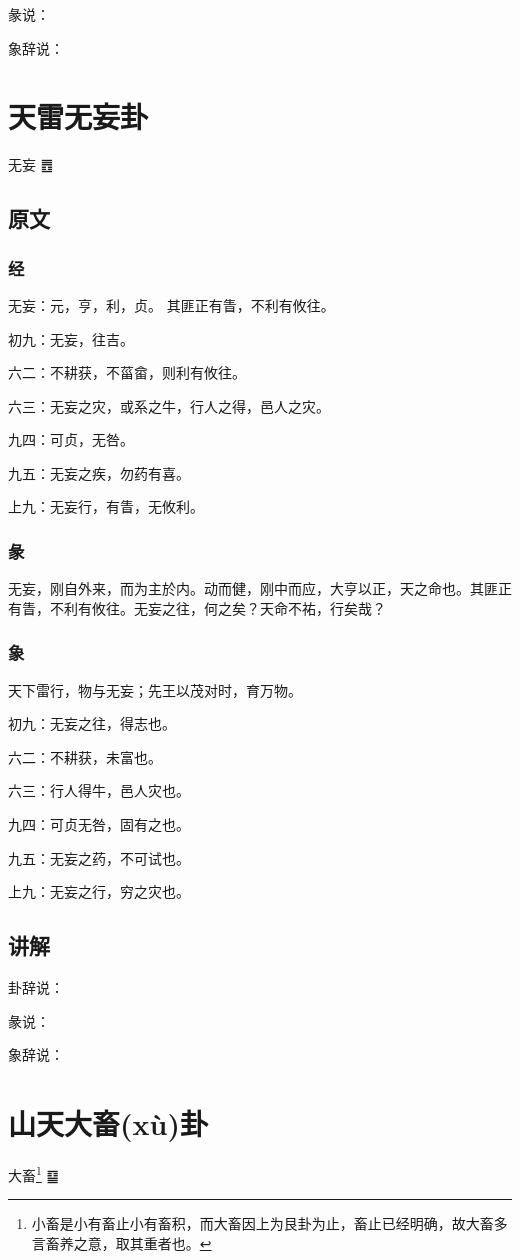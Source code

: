 \documentclass[12pt,oneside]{book}
\begin{document}
彖说：

象辞说：

\chapter{天雷无妄卦}
无妄 {\Large ䷘}

\section{原文}
\subsection{经}
无妄：元，亨，利，贞。 其匪正有眚，不利有攸往。

初九：无妄，往吉。

六二：不耕获，不菑畲，则利有攸往。

六三：无妄之灾，或系之牛，行人之得，邑人之灾。

九四：可贞，无咎。

九五：无妄之疾，勿药有喜。

上九：无妄行，有眚，无攸利。

\subsection{彖}
无妄，刚自外来，而为主於内。动而健，刚中而应，大亨以正，天之命也。其匪正有眚，不利有攸往。无妄之往，何之矣？天命不祐，行矣哉？
\subsection{象}
天下雷行，物与无妄；先王以茂对时，育万物。

初九：无妄之往，得志也。

六二：不耕获，未富也。

六三：行人得牛，邑人灾也。

九四：可贞无咎，固有之也。

九五：无妄之药，不可试也。

上九：无妄之行，穷之灾也。

\section{讲解}
卦辞说：

彖说：

象辞说：


\chapter{山天大畜(xù)卦}
大畜\footnote{小畜是小有畜止小有畜积，而大畜因上为艮卦为止，畜止已经明确，故大畜多言畜养之意，取其重者也。} {\Large ䷙}
\end{document}
